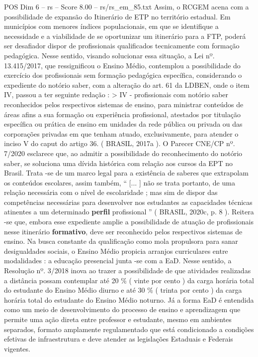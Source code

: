 \begin{textsample}{POS Dim 6 – rs – Score 8.00 – rs/rs\_em\_85.txt}
Assim, o RCGEM acena com a possibilidade de expansão do Itinerário de ETP no território estadual.
Em municípios com menores índices populacionais, em que se identifique a necessidade e a viabilidade de se oportunizar um itinerário para a FTP, poderá ser desafiador dispor de profissionais qualificados tecnicamente com formação pedagógica.
Nesse sentido, visando solucionar essa situação, a Lei nº. 13.415/2017, que ressignificou o Ensino Médio, contemplou a possibilidade do exercício dos profissionais sem formação pedagógica específica, considerando o expediente do notório saber, com a alteração do art. 61 da LDBEN, onde o item IV, passou a ter seguinte redação : > IV - profissionais com notório saber reconhecidos pelos respectivos sistemas de ensino, para ministrar conteúdos de áreas afins a sua formação ou experiência profissional, atestados por titulação específica ou prática de ensino em unidades da rede pública ou privada ou das corporações privadas em que tenham atuado, exclusivamente, para atender o inciso V do caput do artigo 36. ( BRASIL, 2017a ).
O Parecer CNE/CP nº. 7/2020 esclarece que, ao admitir a possibilidade do reconhecimento do notório saber, se soluciona uma dívida histórica com relação aos cursos da EPT no Brasil.
Trata -se de um marco legal para a existência de saberes que extrapolam os conteúdos escolares, assim também, “ [... ] não se trata portanto, de uma relação necessária com o nível de escolaridade ; mas sim de dispor das competências necessárias para desenvolver nos estudantes as capacidades técnicas atinentes a um determinado \textbf{perfil} profissional ” ( BRASIL, 2020c, p. 8 ).
Reitera -se que, embora esse expediente amplie a possibilidade de atuação de profissionais nesse itinerário \textbf{formativo}, deve ser reconhecido pelos respectivos sistemas de ensino.
Na busca constante da qualificação como mola propulsora para sanar desigualdades sociais, o Ensino Médio propicia arranjos curriculares entre modalidades : a educação presencial junta -se com a EaD.
Nesse sentido, a Resolução nº. 3/2018 inova ao trazer a possibilidade de que atividades realizadas a distância possam contemplar até 20 \% ( vinte por cento ) da carga horária total do estudante do Ensino Médio diurno e até 30 \% ( trinta por cento ) da carga horária total do estudante do Ensino Médio noturno.
Já a forma EaD é entendida como um meio de desenvolvimento do processo de ensino e aprendizagem que permite uma ação direta entre professor e estudante, mesmo em ambientes separados, formato amplamente regulamentado que está condicionado a condições efetivas de infraestrutura e deve atender as legislações Estaduais e Federais vigentes.

\end{textsample}
